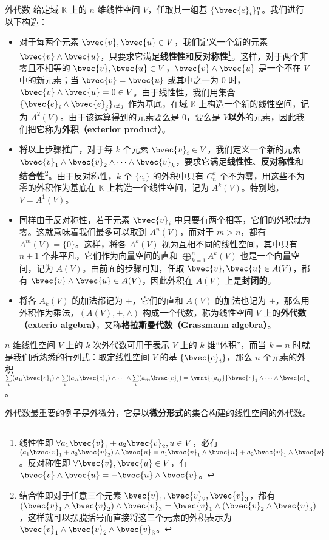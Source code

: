 \begin{example}{外代数}\label{AlgFie_ex1}
给定域 $\mathbb{K}$ 上的 $n$ 维线性空间 $V$，任取其一组基 $\{\bvec{e}_i\}^n_{1}$。我们进行以下构造：
\begin{itemize}
\item 对于每两个元素 $\bvec{v}, \bvec{u}\in V$，我们定义一个新的元素 $\bvec{v}\wedge \bvec{u}$，只要求它满足\textbf{线性性}和\textbf{反对称性}\footnote{线性性即 $\forall a_1\bvec{v}_1+a_2\bvec{v}_2,{u}\in V$，必有 $(a_1\bvec{v}_1+a_2\bvec{v}_2)\wedge\bvec{u}=a_1\bvec{v}_1\wedge\bvec{u}+a_2\bvec{v}_1\wedge\bvec{u}$。反对称性即 $\forall \bvec{v}, \bvec{u}\in V$，有 $\bvec{v}\wedge\bvec{u}=-\bvec{u}\wedge\bvec{v}$。}。这样，对于两个非零且不相等的 $\bvec{v},\bvec{u}\in V$，$\bvec{v}\wedge \bvec{u}$ 是一个不在 $V$ 中的新元素；当 $\bvec{v}=\bvec{u}$ 或其中之一为 $0$ 时，$\bvec{v}\wedge \bvec{u}=0\in V$。由于线性性，我们用集合 $\{\bvec{e}_i\wedge \bvec{e}_j\}_{i\not=j}$ 作为基底，在域 $\mathbb{K}$ 上构造一个新的线性空间，记为 $A^2(V)$。由于该运算得到的元素要么是 $0$，要么是 $V$\textbf{以外}的元素，因此我们把它称为\textbf{外积（exterior product）}。

\item 将以上步骤推广，对于每 $k$ 个元素 $\bvec{v}_i\in V$，我们定义一个新的元素 $\bvec{v}_1\wedge \bvec{v}_2\wedge\cdots\wedge \bvec{v}_k$，要求它满足\textbf{线性性}、\textbf{反对称性}和\textbf{结合性}\footnote{结合性即对于任意三个元素 $\bvec{v}_1,\bvec{v}_2,\bvec{v}_3$，都有 $(\bvec{v}_1\wedge \bvec{v}_2)\wedge \bvec{v}_3=\bvec{v}_1\wedge(\bvec{v}_2\wedge \bvec{v}_3)$，这样就可以摆脱括号而直接将这三个元素的外积表示为 $\bvec{v}_1\wedge \bvec{v}_2\wedge \bvec{v}_3$。}。由于反对称性，$k$ 个 $\{e_i\}$ 的外积中只有 $C^k_n$ 个不为零，用这些不为零的外积作为基底在 $\mathbb{K}$ 上构造一个线性空间，记为 $A^k(V)$。特别地，$V=A^1(V)$。

\item 同样由于反对称性，若干元素 $\bvec{v}_i$ 中只要有两个相等，它们的外积就为零。这就意味着我们最多可以取到 $A^n(V)$，而对于 $m>n$，都有 $A^m(V)=\{0\}$。这样，将各 $A^k(V)$ 视为互相不同的线性空间，其中只有 $n+1$ 个非平凡，它们作为向量空间的直和 $\bigoplus\limits_{k=1}^n A^k(V)$ 也是一个向量空间，记为 $A(V)$。由前面的步骤可知，任取 $\bvec{v}, \bvec{u}\in A(V)$，都有 $\bvec{v}\wedge\bvec{u}\in A(V)$，因此外积在 $A(V)$ 上是\textbf{封闭的}。
\item 将各 $A_k(V)$ 的加法都记为 $+$，它们的直和 $A(V)$ 的加法也记为 $+$，那么用外积作为乘法，$(A(V), +, \wedge)$ 构成一个代数，称为线性空间 $V$ 上的\textbf{外代数（exterio algebra）}，又称\textbf{格拉斯曼代数（Grassmann algebra）}。
\end{itemize}

\end{example}

$n$ 维线性空间 $V$ 上的 $k$ 次外代数可用于表示 $V$ 上的 $k$ 维“体积”，而当 $k=n$ 时就是我们所熟悉的行列式：取定线性空间 $V$ 的基 $\{\bvec{e}_i\}$，那么 $n$ 个元素的外积 $\sum\limits_{i}(a_{1i}\bvec{e}_i)\wedge\sum\limits_{i}(a_{2i}\bvec{e}_i)\wedge\cdots\wedge\sum\limits_{i}(a_{ni}\bvec{e}_i)=\vmat{\{a_{ij}\}}\bvec{e}_1\wedge\cdots\wedge\bvec{e}_n$。

外代数最重要的例子是外微分，它是以\textbf{微分形式}的集合构建的线性空间的外代数。
